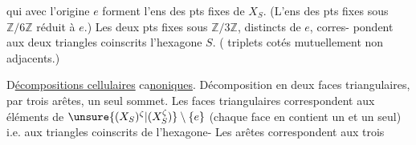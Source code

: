 
qui avec l'origine $e$ forment l'ens
des pts fixes de $X_S$. (L'ens
des pts fixes sous $\mathbb Z/6\mathbb Z$  réduit
à $e$.) Les deux pts fixes
sous $\mathbb Z/3\mathbb Z$, distincts de $e$, corres-\newline
pondent aux deux triangles coinscrits
 l'hexagone $S$. ( triplets 
cotés mutuellement non adjacents.)

D\uline{écompositions cellulaires}\newline
ca\uline{noniques}. Décomposition en
deux faces triangulaires, par trois
arêtes, un seul sommet. Les
faces triangulaires correspondent aux
éléments de $\unsure{(X_S)^\zeta|(X_S^\zeta)}\setminus\{e\}$ (chaque
face en contient un et un seul) i.e.
aux triangles coinscrits de l'hexagone-\newline
Les arêtes correspondent aux trois

